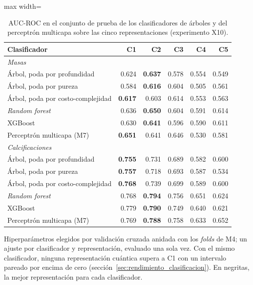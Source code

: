\begin{table}[H]
\centering
\small
\caption{AUC-ROC en el conjunto de prueba de los clasificadores de árboles y del perceptrón multicapa sobre las cinco representaciones (experimento X10).}
\label{tab:x10_arboles}
\begin{adjustbox}{max width=\linewidth}
\begin{tabular}{l r r r r r}
\toprule
Clasificador & C1 & C2 & C3 & C4 & C5 \\
\midrule
\multicolumn{6}{l}{\textit{Masas}} \\
\quad Árbol, poda por profundidad & 0.624 & \textbf{0.637} & 0.578 & 0.554 & 0.549 \\
\quad Árbol, poda por pureza & 0.584 & \textbf{0.616} & 0.604 & 0.505 & 0.561 \\
\quad Árbol, poda por costo-complejidad & \textbf{0.617} & 0.603 & 0.614 & 0.553 & 0.563 \\
\quad \textit{Random forest} & 0.636 & \textbf{0.650} & 0.604 & 0.591 & 0.614 \\
\quad XGBoost & 0.630 & \textbf{0.641} & 0.596 & 0.590 & 0.611 \\
\quad Perceptrón multicapa (M7) & \textbf{0.651} & 0.641 & 0.646 & 0.530 & 0.581 \\
\multicolumn{6}{l}{\textit{Calcificaciones}} \\
\quad Árbol, poda por profundidad & \textbf{0.755} & 0.731 & 0.689 & 0.582 & 0.600 \\
\quad Árbol, poda por pureza & \textbf{0.757} & 0.718 & 0.693 & 0.587 & 0.534 \\
\quad Árbol, poda por costo-complejidad & \textbf{0.768} & 0.739 & 0.699 & 0.589 & 0.600 \\
\quad \textit{Random forest} & 0.768 & \textbf{0.794} & 0.756 & 0.651 & 0.624 \\
\quad XGBoost & 0.779 & \textbf{0.790} & 0.749 & 0.640 & 0.621 \\
\quad Perceptrón multicapa (M7) & 0.769 & \textbf{0.788} & 0.758 & 0.633 & 0.652 \\
\bottomrule
\end{tabular}
\end{adjustbox}
\par\smallskip
\parbox{0.95\linewidth}{\footnotesize Hiperparámetros elegidos por validación cruzada anidada con los \textit{folds} de M4; un ajuste por clasificador y representación, evaluado una sola vez. Con el mismo clasificador, ninguna representación cuántica supera a C1 con un intervalo pareado por encima de cero (sección~\ref{sec:rendimiento_clasificacion}). En negritas, la mejor representación para cada clasificador.}
\end{table}
